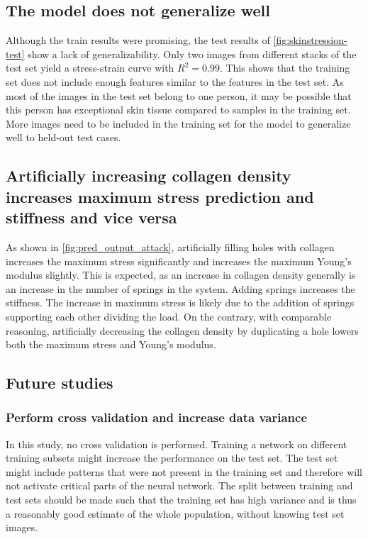 \subsection{The model does not generalize well}
Although the train results were promising, the test results of \cref{fig:skinstression-test} show a lack of generalizability.
Only two images from different stacks of the test set yield a stress-strain curve with $R^2=0.99$.
This shows that the training set does not include enough features similar to the features in the test set.
As most of the images in the test set belong to one person, it may be possible that this person has exceptional skin tissue compared to samples in the training set.
More images need to be included in the training set for the model to generalize well to held-out test cases.

\subsection{Artificially increasing collagen density increases maximum stress prediction and stiffness and vice versa}
As shown in \cref{fig:pred_output_attack}, artificially filling holes with collagen increases the maximum stress significantly and increases the maximum Young's modulus slightly.
This is expected, as an increase in collagen density generally is an increase in the number of springs in the system.
Adding springs increases the stiffness.
The increase in maximum stress is likely due to the addition of springs supporting each other dividing the load.
On the contrary, with comparable reasoning, artificially decreasing the collagen density by duplicating a hole lowers both the maximum stress and Young's modulus.

\subsection{Future studies}
\subsubsection{Perform cross validation and increase data variance}
In this study, no cross validation is performed.
Training a network on different training subsets might increase the performance on the test set.
The test set might include patterns that were not present in the training set and therefore will not activate critical parts of the neural network.
The split between training and test sets should be made such that the training set has high variance and is thus a reasonably good estimate of the whole population, without knowing test set images.

